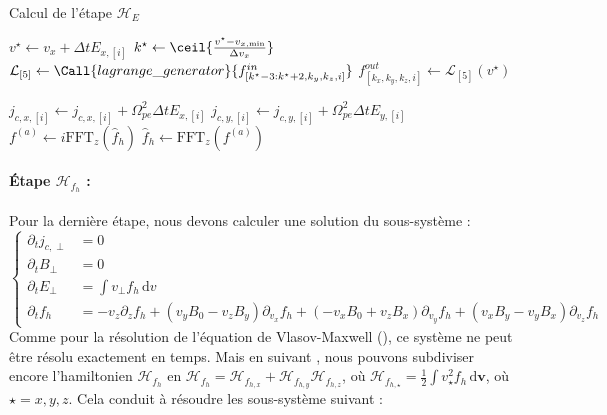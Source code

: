 \begin{algorithm}
  \caption{Calcul de l'étape $\mathcal{H}_{E}$}
  \label{alg:HE}
  \begin{algorithmic}[1]
      \ForAll{$(k_x,k_y,k_z)\in[\![0,N_{v_x}[\![\times[\![0,N_{v_y}[\![\times[\![0,N_{v_z}[\![$}
          \State $v^{\star} \gets v_x + \Delta t E_{x,[i]}$
          \State $k^{\star} \gets \ceil{\frac{ v^{\star}-v_{x,\text{min}} }{ \Delta v_x }}$
          \State $\mathcal{L}_{[5]} \gets \Call{lagrange\_generator}{f^{in}_{[k^\star-3:k^\star+2,k_y,k_z,i]}}$
          \State $f^{out}_{[k_x,k_y,k_z,i]} \gets \mathcal{L}_{[5]}( v^{\star} )$
        \EndFor
      \EndFor
    \EndFunction
      
      \vspace{0.25cm}

        \State $j_{c,x,[i]} \gets j_{c,x,[i]} + \Omega_{pe}^2\Delta t E_{x,[i]}$
        \State $j_{c,y,[i]} \gets j_{c,y,[i]} + \Omega_{pe}^2\Delta t E_{y,[i]}$
      \EndFor
      \State $f^{(a)} \gets i\text{FFT}_z(\hat{f}_h)$ \label{alg:HE:l:ifft}
      \State {}
      \State {}
      \State $\hat{f}_h \gets \text{FFT}_z(f^{(a)})$  \label{alg:HE:l:fft}
    \EndFunction
  \end{algorithmic}
\end{algorithm}

\paragraph{Étape $\mathcal{H}_{f_h}$ :}
Pour la dernière étape, nous devons calculer une solution du sous-système :
$$
  \begin{cases}
    \partial_t  j_{c,\perp} &= 0 \\
    \partial_t B_\perp      &= 0 \\
    \partial_t E_\perp      &= \int v_\perp f_h\,\mathrm{d}v \\
    \partial_t f_h          &= -v_z\partial_zf_h + (v_yB_0-v_zB_y)\partial_{v_x}f_h + (-v_xB_0+v_zB_x)\partial_{v_y}f_h + (v_xB_y - v_yB_x)\partial_{v_z}f_h
  \end{cases}
$$
Comme pour la résolution de l'équation de Vlasov-Maxwell (\cite{Li:2020}), ce système ne peut être résolu exactement en temps. Mais en suivant \cite{Li:2020}, nous pouvons subdiviser encore l'hamiltonien $\mathcal{H}_{f_h}$ en $\mathcal{H}_{f_h}=\mathcal{H}_{f_{h,x}}+\mathcal{H}_{f_{h,y}}\mathcal{H}_{f_{h,z}}$, où $\mathcal{H}_{f_{h,\star}}=\frac{1}{2}\int v_{\star}^2 f_h\,\mathrm{d}\textbf{v}$, où $\star=x,y,z$. Cela conduit à résoudre les sous-système suivant :

